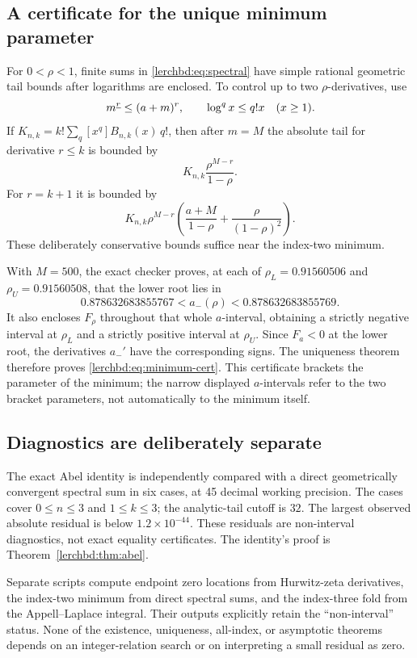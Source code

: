 \subsection{A certificate for the unique minimum parameter}
For $0<\rho<1$, finite sums in \eqref{lerchbd:eq:spectral} have simple rational geometric tail bounds after logarithms are enclosed. To control up to two $\rho$-derivatives, use
\[
 m^{\underline{r}}\le(a+m)^r,\qquad \log^q x\le q!x\quad(x\ge1).
\]
If $K_{n,k}=k!\sum_q [x^q]B_{n,k}(x)\,q!$, then after $m=M$ the absolute tail for derivative $r\le k$ is bounded by
\[
 K_{n,k}\frac{\rho^{M-r}}{1-\rho}.
\]
For $r=k+1$ it is bounded by
\[
 K_{n,k}\rho^{M-r}
 \left(\frac{a+M}{1-\rho}+\frac{\rho}{(1-\rho)^2}\right).
\]
These deliberately conservative bounds suffice near the index-two minimum.

With $M=500$, the exact checker proves, at each of $\rho_L=0.91560506$ and $\rho_U=0.91560508$, that the lower root lies in
\[
 0.878632683855767<a_-(\rho)<0.878632683855769.
\]
It also encloses $F_\rho$ throughout that whole $a$-interval, obtaining a strictly negative interval at $\rho_L$ and a strictly positive interval at $\rho_U$. Since $F_a<0$ at the lower root, the derivatives $a_-'$ have the corresponding signs. The uniqueness theorem therefore proves \eqref{lerchbd:eq:minimum-cert}. This certificate brackets the parameter of the minimum; the narrow displayed $a$-intervals refer to the two bracket parameters, not automatically to the minimum itself.

\subsection{Diagnostics are deliberately separate}
The exact Abel identity is independently compared with a direct geometrically convergent spectral sum in six cases, at 45 decimal working precision. The cases cover $0\le n\le3$ and $1\le k\le3$; the analytic-tail cutoff is $32$. The largest observed absolute residual is below $1.2\times10^{-44}$. These residuals are non-interval diagnostics, not exact equality certificates. The identity's proof is Theorem~\ref{lerchbd:thm:abel}.

Separate scripts compute endpoint zero locations from Hurwitz-zeta derivatives, the index-two minimum from direct spectral sums, and the index-three fold from the Appell--Laplace integral. Their outputs explicitly retain the ``non-interval'' status. None of the existence, uniqueness, all-index, or asymptotic theorems depends on an integer-relation search or on interpreting a small residual as zero.

